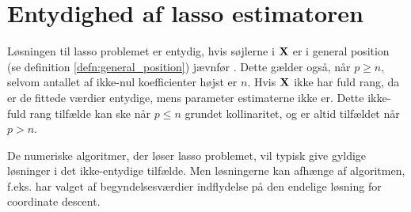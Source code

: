 \section{Entydighed af lasso estimatoren}
Løsningen til lasso problemet er entydig, hvis søjlerne i \(\mathbf{X}\) er i general position (se definition \ref{defn:general_position}) jævnfør \citep{lasso_unique}.
Dette gælder også, når \(p \geq n\), selvom antallet af ikke-nul koefficienter højst er \(n\).
Hvis \(\mathbf{X}\) ikke har fuld rang, da er de fittede værdier entydige, mens parameter estimaterne ikke er.
Dette ikke-fuld rang tilfælde kan ske når \(p \leq n\) grundet kollinaritet, og er altid tilfældet når \(p>n\).

De numeriske algoritmer, der løser lasso problemet, vil typisk give gyldige løsninger i det ikke-entydige tilfælde.
Men løsningerne kan afhænge af algoritmen, f.eks. har valget af begyndelsesværdier indflydelse på den endelige løsning for coordinate descent.

%


